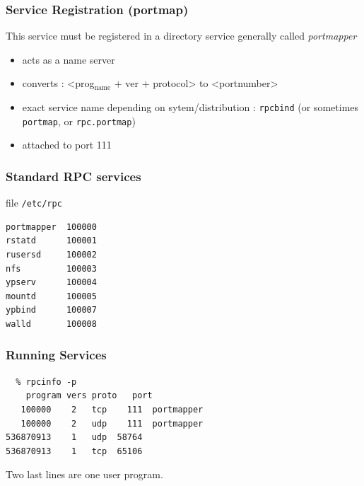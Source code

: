 \documentclass[bigger,hyperref={colorlinks=true, urlcolor=red, plainpages=false, pdfpagelabels, bookmarksnumbered}]{beamer}
\begin{document}
\begin{frame}
\frametitle{Service Registration (portmap)}
\label{sec-2-4}

 This service must be registered in a directory service generally called \emph{portmapper} 
\begin{itemize}
\item acts as a name server
\item converts : <prog$_{\mathrm{name}}$ + ver + protocol> to <portnumber>
\item exact service name depending on sytem/distribution : \texttt{rpcbind} (or sometimes \texttt{portmap}, or \texttt{rpc.portmap})
\item attached to port 111
\end{itemize}
\end{frame}
\begin{frame}[fragile]
\frametitle{Standard RPC services}
\label{sec-2-5}
\begin{block}{file \texttt{/etc/rpc}}
\label{sec-2-5-1}


\lstset{language=C}
\begin{lstlisting}
portmapper  100000  
rstatd      100001  
rusersd     100002  
nfs         100003  
ypserv      100004 
mountd      100005 
ypbind      100007
walld       100008
\end{lstlisting}
     
\end{block}
\end{frame}
\begin{frame}[fragile]
\frametitle{Running Services}
\label{sec-2-6}


\lstset{language=C}
\begin{lstlisting}
  % rpcinfo -p
    program vers proto   port
   100000    2   tcp    111  portmapper
   100000    2   udp    111  portmapper
536870913    1   udp  58764
536870913    1   tcp  65106
\end{lstlisting}
 Two last lines are one user program.


 
\end{frame}
\end{document}
